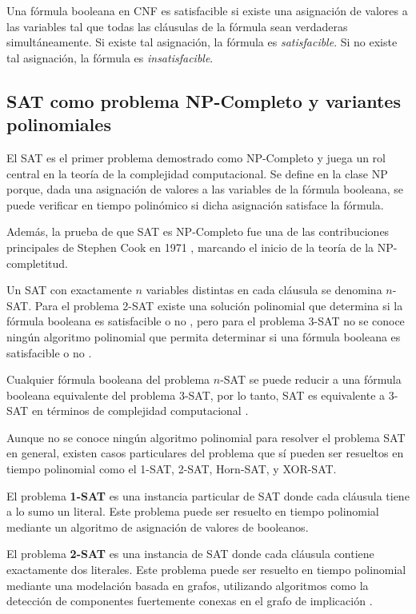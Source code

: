 Una fórmula booleana en CNF es satisfacible si existe una asignación de valores a las variables tal que todas las cláusulas de la fórmula sean verdaderas simultáneamente.
Si existe tal asignación, la fórmula es \textit{satisfacible}. Si no existe tal asignación, la fórmula es \textit{insatisfacible}.

\subsection{SAT como problema NP-Completo y variantes polinomiales}

El SAT es el primer problema demostrado como NP-Completo \cite{authomataTheory} y juega un rol central en la teoría de la complejidad computacional. Se define en la clase NP porque, dada una asignación de valores a las variables de la fórmula booleana, se puede verificar en tiempo polinómico si dicha asignación satisface la fórmula.

Además, la prueba de que SAT es NP-Completo fue una de las contribuciones principales de Stephen Cook en 1971 \cite{authomataTheory}, marcando el inicio de la teoría de la NP-completitud.

Un SAT con exactamente $n$ variables distintas en cada cláusula se denomina $n$-SAT. Para el problema 2-SAT existe una solución polinomial que determina si la fórmula booleana es satisfacible o no \cite{2satbib}, pero para el problema 3-SAT no se conoce ningún algoritmo polinomial que permita
determinar si una fórmula booleana es satisfacible o no \cite{authomataTheory}.

Cualquier fórmula booleana del problema $n$-SAT se puede reducir a una fórmula booleana equivalente del problema 3-SAT, 
por lo tanto, SAT es equivalente a 3-SAT en términos de complejidad computacional \cite{authomataTheory}.

Aunque no se conoce ningún algoritmo polinomial para resolver el problema SAT en general,
existen casos particulares del problema que sí pueden ser resueltos en tiempo polinomial como el 1-SAT, 2-SAT, Horn-SAT, y XOR-SAT.

El problema \textbf{1-SAT} es una instancia particular de SAT donde cada cláusula tiene a lo sumo un literal.
Este problema puede ser resuelto en tiempo polinomial mediante un algoritmo de asignación de valores de booleanos.

El problema \textbf{2-SAT} es una instancia de SAT donde cada cláusula contiene exactamente dos literales.  Este problema puede ser resuelto en tiempo polinomial mediante una modelación basada en grafos, utilizando algoritmos como la detección de componentes fuertemente conexas en el grafo de implicación \cite{2satbib}.

